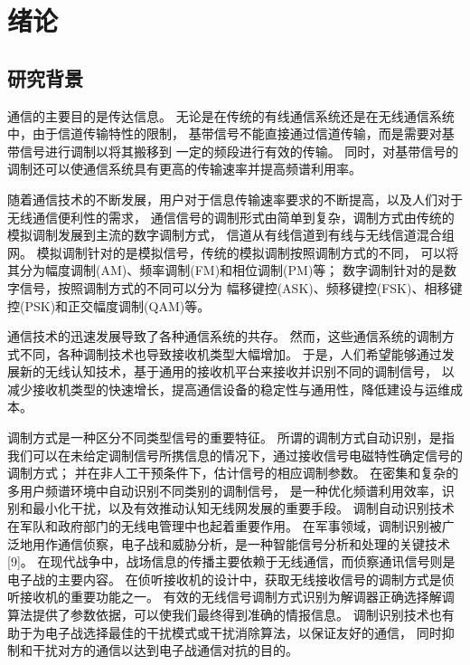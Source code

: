 
\chapter{绪论}
\section{研究背景}

通信的主要目的是传达信息。 
无论是在传统的有线通信系统还是在无线通信系统中，由于信道传输特性的限制，
基带信号不能直接通过信道传输，而是需要对基带信号进行调制以将其搬移到 一定的频段进行有效的传输。 
同时，对基带信号的调制还可以使通信系统具有更高的传输速率并提高频谱利用率。\par

随着通信技术的不断发展，用户对于信息传输速率要求的不断提高，以及人们对于无线通信便利性的需求，
通信信号的调制形式由简单到复杂，调制方式由传统的模拟调制发展到主流的数字调制方式，
信道从有线信道到有线与无线信道混合组网。
模拟调制针对的是模拟信号，传统的模拟调制按照调制方式的不同，
可以将其分为幅度调制(AM)、频率调制(FM)和相位调制(PM)等；
数字调制针对的是数字信号，按照调制方式的不同可以分为
幅移键控(ASK)、频移键控(FSK)、相移键控(PSK)和正交幅度调制(QAM)等。 \par

通信技术的迅速发展导致了各种通信系统的共存。
 然而，这些通信系统的调制方式不同，各种调制技术也导致接收机类型大幅增加。
 于是，人们希望能够通过发展新的无线认知技术，基于通用的接收机平台来接收并识别不同的调制信号，
 以减少接收机类型的快速增长，提高通信设备的稳定性与通用性，降低建设与运维成本。 \par

调制方式是一种区分不同类型信号的重要特征。
所谓的调制方式自动识别，是指我们可以在未给定调制信号所携信息的情况下，通过接收信号电磁特性确定信号的调制方式；
并在非人工干预条件下，估计信号的相应调制参数。
在密集和复杂的多用户频谱环境中自动识别不同类别的调制信号，
是一种优化频谱利用效率，识别和最小化干扰，以及有效推动认知无线网发展的重要手段。
调制自动识别技术在军队和政府部门的无线电管理中也起着重要作用。
在军事领域，调制识别被广泛地用作通信侦察，电子战和威胁分析，是一种智能信号分析和处理的关键技术[9]。
在现代战争中，战场信息的传播主要依赖于无线通信，而侦察通讯信号则是电子战的主要内容。
在侦听接收机的设计中，获取无线接收信号的调制方式是侦听接收机的重要功能之一。
有效的无线信号调制方式识别为解调器正确选择解调算法提供了参数依据，可以使我们最终得到准确的情报信息。
调制识别技术也有助于为电子战选择最佳的干扰模式或干扰消除算法，以保证友好的通信，
同时抑制和干扰对方的通信以达到电子战通信对抗的目的。\par

